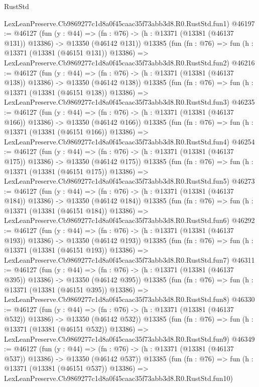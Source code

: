 \begin{lexlean}{RustStd}
\begin{coremodule}
    LexLeanPreserve.Cb9869277c1d8a0f45caac35f73abb3d8.R0.RustStd.fun1)
@46197 := @46127
    (fun (y : @44) =>
    (fn : @76) -> (h : @13371 (@13381 (@46137 @131)) @13386) -> @13350 (@46142 @131))
    @13385
    (fun (fn : @76) =>
    fun (h : @13371 (@13381 (@46151 @131)) @13386) =>
    LexLeanPreserve.Cb9869277c1d8a0f45caac35f73abb3d8.R0.RustStd.fun2)
@46216 := @46127
    (fun (y : @44) =>
    (fn : @76) -> (h : @13371 (@13381 (@46137 @138)) @13386) -> @13350 (@46142 @138))
    @13385
    (fun (fn : @76) =>
    fun (h : @13371 (@13381 (@46151 @138)) @13386) =>
    LexLeanPreserve.Cb9869277c1d8a0f45caac35f73abb3d8.R0.RustStd.fun3)
@46235 := @46127
    (fun (y : @44) =>
    (fn : @76) -> (h : @13371 (@13381 (@46137 @166)) @13386) -> @13350 (@46142 @166))
    @13385
    (fun (fn : @76) =>
    fun (h : @13371 (@13381 (@46151 @166)) @13386) =>
    LexLeanPreserve.Cb9869277c1d8a0f45caac35f73abb3d8.R0.RustStd.fun4)
@46254 := @46127
    (fun (y : @44) =>
    (fn : @76) -> (h : @13371 (@13381 (@46137 @175)) @13386) -> @13350 (@46142 @175))
    @13385
    (fun (fn : @76) =>
    fun (h : @13371 (@13381 (@46151 @175)) @13386) =>
    LexLeanPreserve.Cb9869277c1d8a0f45caac35f73abb3d8.R0.RustStd.fun5)
@46273 := @46127
    (fun (y : @44) =>
    (fn : @76) -> (h : @13371 (@13381 (@46137 @184)) @13386) -> @13350 (@46142 @184))
    @13385
    (fun (fn : @76) =>
    fun (h : @13371 (@13381 (@46151 @184)) @13386) =>
    LexLeanPreserve.Cb9869277c1d8a0f45caac35f73abb3d8.R0.RustStd.fun6)
@46292 := @46127
    (fun (y : @44) =>
    (fn : @76) -> (h : @13371 (@13381 (@46137 @193)) @13386) -> @13350 (@46142 @193))
    @13385
    (fun (fn : @76) =>
    fun (h : @13371 (@13381 (@46151 @193)) @13386) =>
    LexLeanPreserve.Cb9869277c1d8a0f45caac35f73abb3d8.R0.RustStd.fun7)
@46311 := @46127
    (fun (y : @44) =>
    (fn : @76) -> (h : @13371 (@13381 (@46137 @395)) @13386) -> @13350 (@46142 @395))
    @13385
    (fun (fn : @76) =>
    fun (h : @13371 (@13381 (@46151 @395)) @13386) =>
    LexLeanPreserve.Cb9869277c1d8a0f45caac35f73abb3d8.R0.RustStd.fun8)
@46330 := @46127
    (fun (y : @44) =>
    (fn : @76) -> (h : @13371 (@13381 (@46137 @532)) @13386) -> @13350 (@46142 @532))
    @13385
    (fun (fn : @76) =>
    fun (h : @13371 (@13381 (@46151 @532)) @13386) =>
    LexLeanPreserve.Cb9869277c1d8a0f45caac35f73abb3d8.R0.RustStd.fun9)
@46349 := @46127
    (fun (y : @44) =>
    (fn : @76) -> (h : @13371 (@13381 (@46137 @537)) @13386) -> @13350 (@46142 @537))
    @13385
    (fun (fn : @76) =>
    fun (h : @13371 (@13381 (@46151 @537)) @13386) =>
    LexLeanPreserve.Cb9869277c1d8a0f45caac35f73abb3d8.R0.RustStd.fun10)

\end{coremodule}
\end{lexlean}
